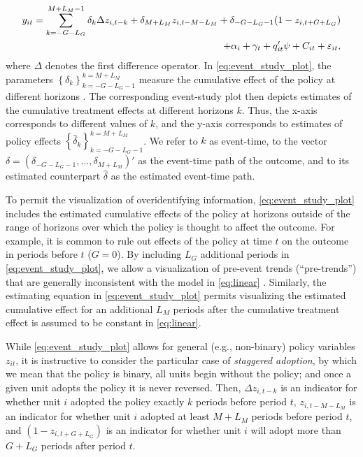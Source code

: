 \documentclass[12pt]{article}
\begin{document}
\begin{equation}
\label{eq:event_study_plot}
\begin{split}
y_{it} = \sum_{k=-G-L_G}^{M+L_M -1}\delta_k \Delta  z_{i,t-k} + \delta_{M+L_M} z_{i,t-M-L_M} + \delta_{-G-L_G-1}(1-z_{i,t+G+L_G})
\\ \centering
+ \alpha_{i} + \gamma_{t} + q'_{it}\psi + C_{it} + \varepsilon_{it},
\end{split}
\end{equation}
where $\Delta$ denotes the first difference operator.
In \eqref{eq:event_study_plot}, the parameters $\left\{ \delta_k \right\}_{k = - G - L_G - 1}^{k = M + L_M}$ measure the cumulative effect of the policy at different horizons \citep{schmidheiny2023event}.
The corresponding event-study plot then depicts estimates of the cumulative treatment effects at different horizons $k$.
Thus, the x-axis corresponds to different values of $k$, and the y-axis corresponds to estimates of policy effects $\left\{ \widehat{\delta}_k \right\}_{k = - G - L_G - 1}^{k = M + L_M}$.
We refer to $k$ as event-time, to the vector $\delta = (\delta_{-G - L_G -1}, \ldots, \delta_{M + L_M})'$ as the event-time path of the outcome, and to its estimated counterpart $\widehat{\delta}$ as the estimated event-time path.

To permit the visualization of overidentifying information, \eqref{eq:event_study_plot} includes the estimated cumulative effects of the policy at horizons outside of the range of horizons over which the policy is thought to affect the outcome.
For example, it is common to rule out effects of the policy at time $t$ on the outcome in periods before $t$ ($G=0$).
\label{newcite_pretrends}
By including $L_G$ additional periods in \eqref{eq:event_study_plot}, we allow a visualization of pre-event trends (``pre-trends'') that are generally inconsistent with the model in \eqref{eq:linear}  \citep{freyaldenhoven2019pre}.
Similarly, the estimating equation in \eqref{eq:event_study_plot} permits visualizing the estimated cumulative effect for an additional $L_M$ periods after the cumulative treatment effect is assumed to be constant in \eqref{eq:linear}.

While \eqref{eq:event_study_plot} allows for general (e.g., non-binary) policy variables $z_{it}$, it is instructive to consider the particular case of \textit{staggered adoption}, by which we mean that the policy is binary, all units begin without the policy; and once a given unit adopts the policy it is never reversed.
Then, $\Delta z_{i,t-k}$ is an indicator for whether unit $i$ adopted the policy exactly $k$ periods before period $t$,  $z_{i,t-M-L_M}$ is an indicator for whether unit $i$ adopted at least $M+L_M$ periods before period $t$, and $(1-z_{i,t+G+L_G})$ is an indicator for whether unit $i$ will adopt more than $G+L_G$ periods after period $t$.
\end{document}
